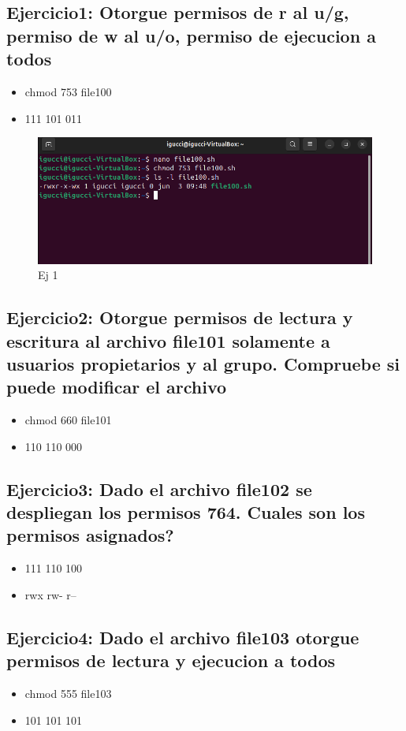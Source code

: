 \documentclass[11pt,twoside]{book}
\begin{document}
        \subsection*{Ejercicio1:  Otorgue permisos de r al u/g, permiso de w al u/o, permiso de ejecucion a todos}
        \begin{itemize}
        \item chmod 753 file100
        \item 111 101 011
        \end{itemize}

\begin{figure}
    \centering
    \includegraphics[width=1\linewidth]{file100.png}
    \caption{Ej 1}
\end{figure}
        \subsection*{Ejercicio2: Otorgue permisos  de lectura y escritura al archivo file101 solamente a usuarios propietarios y al grupo. Compruebe si puede modificar el archivo}
        \begin{itemize}
          \item chmod 660 file101
          \item 110 110 000
        \end{itemize}
        
        \subsection*{Ejercicio3: Dado el archivo file102 se despliegan los permisos 764. Cuales son los permisos asignados?}
        \begin{itemize}
          \item 111 110 100
          \item rwx rw- r--
        \end{itemize}
        
        \subsection*{Ejercicio4: Dado el archivo file103 otorgue permisos de lectura y ejecucion a todos}
        \begin{itemize}
          \item chmod 555 file103
          \item 101 101 101

        \end{itemize}
        
\end{document}
